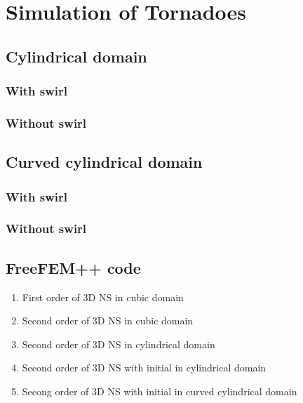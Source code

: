 \documentclass[a4paper]{article}
\begin{document}
\newpage
\section{Simulation of Tornadoes}

\subsection{Cylindrical domain}
\subsubsection{With swirl}
\subsubsection{Without swirl}

\subsection{Curved cylindrical domain}
\subsubsection{With swirl}
\subsubsection{Without swirl}

\subsection{FreeFEM++ code}
\begin{enumerate}
	\item First order of 3D NS in cubic domain
	\item Second order of 3D NS in cubic domain
	\item Second order of 3D NS in cylindrical domain
	\item Second order of 3D NS with initial in cylindrical domain
	\item Secong order of 3D NS with initial in curved cylindrical domain
\end{enumerate}
\end{document}
